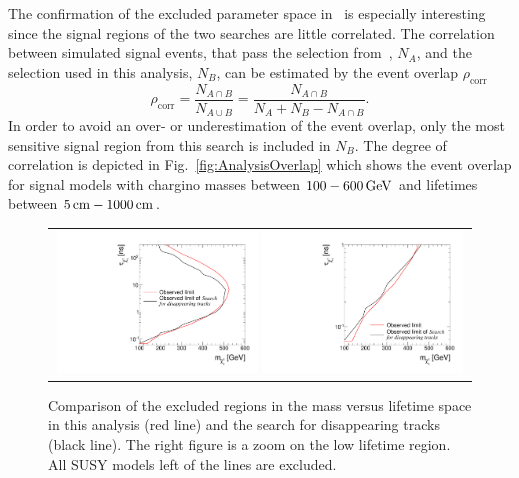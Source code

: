The confirmation of the excluded parameter space in~\cite{bib:CMS:DT_8TeV} is especially interesting since the signal regions of the two searches are little correlated.
The correlation between simulated signal events, that pass the selection from~\cite{bib:CMS:DT_8TeV}, $N_A$, and the selection used in this analysis, $N_B$, can be estimated by the event overlap $\rho_{\text{corr}}$
\begin{equation*}
\rho_{\text{corr}} = \frac{N_{A\cap B}}{N_{A \cup B}} = \frac{N_{A\cap B}}{N_A + N_B - N_{A \cap B}}.
\end{equation*}
In order to avoid an over- or underestimation of the event overlap, only the most sensitive signal region from this search is included in $N_B$.
The degree of correlation is depicted in Fig.~\ref{fig:AnalysisOverlap} which shows the event overlap for signal models with chargino masses between $100-600\,\text{Ge}\kern-0.06667em\text{V}$ and lifetimes between $5\,\text{cm}-1000\,\text{cm}$.
\begin{figure}[!t]
  \centering 
  \begin{tabular}{c}
    \includegraphics[width=0.49\textwidth]{figures/analysis/Interpretation/Comparison2dLimits_largerRange.pdf}  
    \includegraphics[width=0.49\textwidth]{figures/analysis/Interpretation/Comparison2dLimits.pdf} 
  \end{tabular}
  \caption{Comparison of the excluded regions in the mass versus lifetime space in this analysis (red line) and the search for disappearing tracks~\cite{bib:CMS:DT_8TeV} (black line). 
           The right figure is a zoom on the low lifetime region. All SUSY models left of the lines are excluded.}
  \label{fig:Comparison2dLimit}
\end{figure} 
